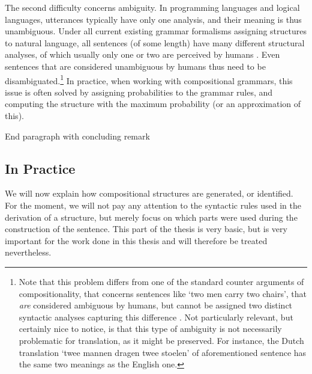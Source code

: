 \documentclass{report}
\begin{document}
The second difficulty concerns ambiguity. In programming languages and logical languages, utterances typically have only one analysis, and their meaning is thus unambiguous. Under all current existing grammar formalisms assigning structures to natural language, all sentences (of some length) have many different structural analyses, of which usually only one or two are perceived by humans \citep{scha1990taaltheorie}. Even sentences that are considered unambiguous by humans thus need to be disambiguated.\footnote{Note that this problem differs from one of the standard counter arguments of compositionality, that concerns sentences like `two men carry two chairs', that \textit{are} considered ambiguous by humans, but cannot be assigned two distinct syntactic analyses capturing this difference \citep{pelletier1994principle}. Not particularly relevant, but certainly nice to notice, is that this type of ambiguity is not necessarily problematic for translation, as it might be preserved. For instance, the Dutch translation `twee mannen dragen twee stoelen' of aforementioned sentence has the same two meanings as the English one.} In practice, when working with compositional grammars, this issue is often solved by assigning probabilities to the grammar rules, and computing the structure with the maximum probability (or an approximation of this).

End paragraph with concluding remark


\subsection{In Practice}

We will now explain how compositional structures are generated, or identified. For the moment, we will not pay any attention to the syntactic rules used in the derivation of a structure, but merely focus on which parts were used during the construction of the sentence. This part of the thesis is very basic, but is very important for the work done in this thesis and will therefore be treated nevertheless.
\end{document}
